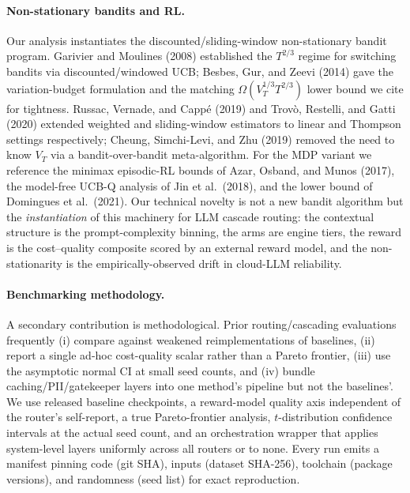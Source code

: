 \documentclass[11pt]{article}
\begin{document}
\paragraph{Non-stationary bandits and RL.}
Our analysis instantiates the discounted/sliding-window non-stationary bandit
program. Garivier and Moulines (2008) established the $T^{2/3}$ regime for
switching bandits via discounted/windowed UCB; Besbes, Gur, and Zeevi (2014)
gave the variation-budget formulation and the matching
$\Omega(V_T^{1/3}T^{2/3})$ lower bound we cite for tightness. Russac, Vernade,
and Capp\'e (2019) and Trov\`o, Restelli, and Gatti (2020) extended weighted
and sliding-window estimators to linear and Thompson settings respectively;
Cheung, Simchi-Levi, and Zhu (2019) removed the need to know $V_T$ via a
bandit-over-bandit meta-algorithm. For the MDP variant we reference the
minimax episodic-RL bounds of Azar, Osband, and Munos (2017), the model-free
\textsc{UCB-Q} analysis of Jin et al.\ (2018), and the lower bound of
Domingues et al.\ (2021). Our technical novelty is not a new bandit algorithm
but the \emph{instantiation} of this machinery for LLM cascade routing: the
contextual structure is the prompt-complexity binning, the arms are engine
tiers, the reward is the cost--quality composite scored by an external reward
model, and the non-stationarity is the empirically-observed drift in cloud-LLM
reliability.

\paragraph{Benchmarking methodology.}
A secondary contribution is methodological. Prior routing/cascading evaluations
frequently (i) compare against weakened reimplementations of baselines,
(ii) report a single ad-hoc cost-quality scalar rather than a Pareto frontier,
(iii) use the asymptotic normal CI at small seed counts, and (iv) bundle
caching/PII/gatekeeper layers into one method's pipeline but not the baselines'.
We use released baseline checkpoints, a reward-model quality axis independent of
the router's self-report, a true Pareto-frontier analysis, $t$-distribution
confidence intervals at the actual seed count, and an orchestration wrapper that
applies system-level layers uniformly across all routers or to none. Every run
emits a manifest pinning code (git SHA), inputs (dataset SHA-256), toolchain
(package versions), and randomness (seed list) for exact reproduction.
\end{document}
